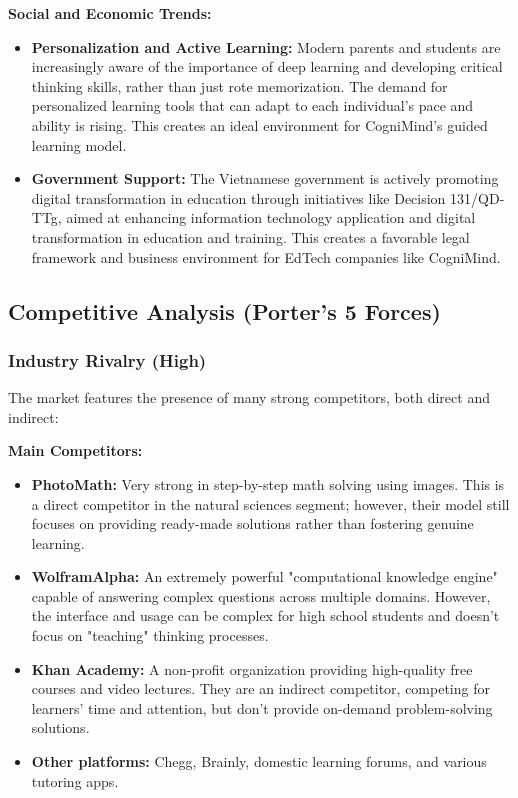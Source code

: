 \textbf{Social and Economic Trends:}
\begin{itemize}
    \item \textbf{Personalization and Active Learning:} Modern parents and students are increasingly aware of the importance of deep learning and developing critical thinking skills, rather than just rote memorization. The demand for personalized learning tools that can adapt to each individual's pace and ability is rising. This creates an ideal environment for CogniMind's guided learning model.
    \item \textbf{Government Support:} The Vietnamese government is actively promoting digital transformation in education through initiatives like Decision 131/QD-TTg, aimed at enhancing information technology application and digital transformation in education and training. This creates a favorable legal framework and business environment for EdTech companies like CogniMind.
\end{itemize}

\subsection{Competitive Analysis (Porter's 5 Forces)}
\subsubsection{Industry Rivalry (High)}
The market features the presence of many strong competitors, both direct and indirect:

\textbf{Main Competitors:}
\begin{itemize}
    \item \textbf{PhotoMath:} Very strong in step-by-step math solving using images. This is a direct competitor in the natural sciences segment; however, their model still focuses on providing ready-made solutions rather than fostering genuine learning.
    \item \textbf{WolframAlpha:} An extremely powerful "computational knowledge engine" capable of answering complex questions across multiple domains. However, the interface and usage can be complex for high school students and doesn't focus on "teaching" thinking processes.
    \item \textbf{Khan Academy:} A non-profit organization providing high-quality free courses and video lectures. They are an indirect competitor, competing for learners' time and attention, but don't provide on-demand problem-solving solutions.
    \item \textbf{Other platforms:} Chegg, Brainly, domestic learning forums, and various tutoring apps.
\end{itemize}

